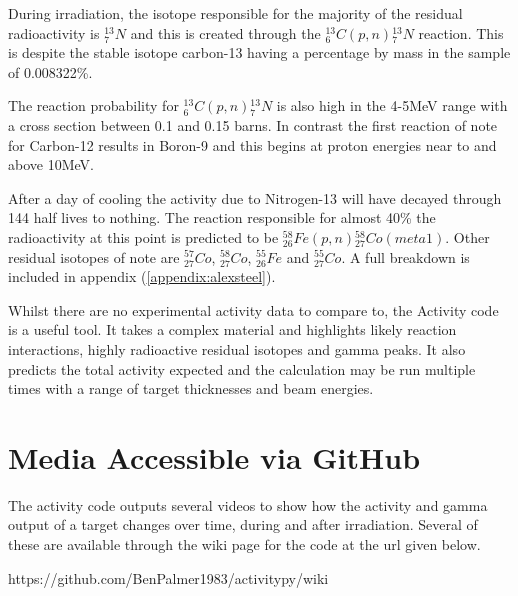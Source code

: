 During irradiation, the isotope responsible for the majority of the residual radioactivity is ${}^{13}_{7}N$ and this is created through the ${}^{13}_{6}C(p, n){}^{13}_{7}N$ reaction.  This is despite the stable isotope carbon-13 having a percentage by mass in the sample of 0.008322\%.

The reaction probability for ${}^{13}_{6}C(p, n){}^{13}_{7}N$ is also high in the 4-5MeV range with a cross section between 0.1 and 0.15 barns.  In contrast the first reaction of note for Carbon-12 results in Boron-9 and this begins at proton energies near to and above 10MeV.

After a day of cooling the activity due to Nitrogen-13 will have decayed through 144 half lives to nothing.  The reaction responsible for almost 40\% the radioactivity at this point is predicted to be ${}^{58}_{26}Fe(p, n){}^{58}_{27}Co (meta 1)$.  Other residual isotopes of note are ${}^{57}_{27}Co$, ${}^{58}_{27}Co$, ${}^{55}_{26}Fe$ and ${}^{55}_{27}Co$.  A full breakdown is included in appendix (\ref{appendix:alexsteel}).

Whilst there are no experimental activity data to compare to, the Activity code is a useful tool.  It takes a complex material and highlights likely reaction interactions, highly radioactive residual isotopes and gamma peaks.  It also predicts the total activity expected and the calculation may be run multiple times with a range of target thicknesses and beam energies.




\FloatBarrier
\section{Media Accessible via GitHub}

The activity code outputs several videos to show how the activity and gamma output of a target changes over time, during and after irradiation.  Several of these are available through the wiki page for the code at the \acrshort{url} given below.

https://github.com/BenPalmer1983/activitypy/wiki














